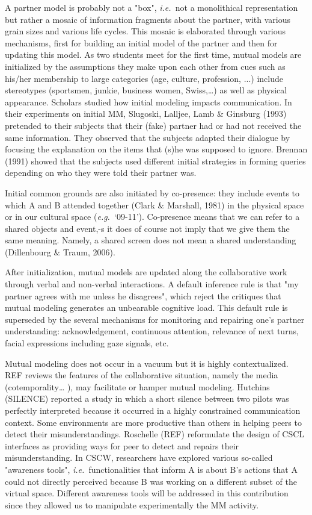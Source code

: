\documentclass{report}
\newcommand{\ie}{{\textit{i.e.\ }}}
\newcommand{\eg}{{\textit{e.g.\ }}}
\begin{document}
A partner model is probably not a "box", \ie not a monolithical representation
but rather a mosaic of information fragments about the partner, with various
grain sizes and various life cycles. This mosaic is elaborated through various
mechanisms, first for building an initial model of the partner and then for
updating this model.  As two students meet for the first time, mutual models are
initialized by the assumptions they make upon each other from cues such as
his/her membership to large categories (age, culture, profession, ...) include
stereotypes (sportsmen, junkie, business women, Swiss,…) as well as physical
appearance. Scholars studied how initial modeling impacts communication. In
their experiments on initial MM, Slugoski, Lalljee, Lamb \& Ginsburg (1993)
pretended to their subjects that their (fake) partner had or had not received
the same information. They observed that the subjects adapted their dialogue by
focusing the explanation on the items that (s)he was supposed to ignore. Brennan
(1991) showed that the subjects used different initial strategies in forming
queries depending on who they were told their partner was.  

Initial common grounds are also initiated by co-presence: they include events to
which A and B attended together (Clark \& Marshall, 1981) in the physical space
or in our cultural space (\eg ‘09-11’). Co-presence means that we can refer to
a shared objects and event,-s it does of course not imply that we give them the
same meaning. Namely, a shared screen does not mean a shared understanding
(Dillenbourg \& Traum, 2006).

After initialization, mutual models are updated along the collaborative work
through verbal and non-verbal interactions. A default inference rule is that "my
partner agrees with me unless he disagrees", which reject the critiques that
mutual modeling generates an unbearable cognitive load. This default rule is
superseded by the several mechanisms for monitoring and repairing one's partner
understanding: acknowledgement, continuous attention, relevance of next turns,
facial expressions including gaze signals, etc.

Mutual modeling does not occur in a vacuum but it is highly contextualized. REF
reviews the features of the collaborative situation, namely the media
(cotemporality… ), may facilitate or hamper mutual modeling. Hutchins (SILENCE)
reported a study in which a short silence between two pilots was perfectly
interpreted because it occurred in a highly constrained communication context.
Some environments are more productive than others in helping peers to detect
their misunderstandings. Roschelle (REF) reformulate the design of CSCL
interfaces as providing ways for peer to detect and repairs their
misunderstanding. In CSCW, researchers have explored various so-called
"awareness tools", \ie functionalities that inform A is about B's actions that
A could not directly perceived because B was working on a different subset of
the virtual space. Different awareness tools will be addressed in this
contribution since they allowed us to manipulate experimentally the MM activity. 
\end{document}
